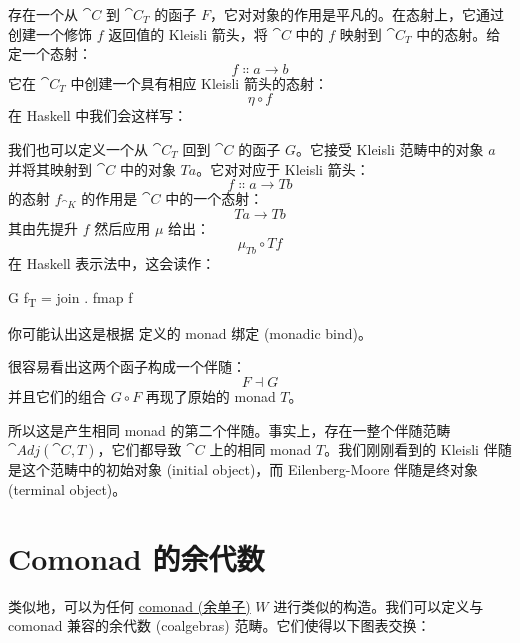 存在一个从 $\cat{C}$ 到 $\cat{C}_T$ 的函子 $F$，它对对象的作用是平凡的。在态射上，它通过创建一个修饰 $f$ 返回值的 Kleisli 箭头，将 $\cat{C}$ 中的 $f$ 映射到 $\cat{C}_T$ 中的态射。给定一个态射：
\[f \Colon a \to b\]
它在 $\cat{C}_T$ 中创建一个具有相应 Kleisli 箭头的态射：
\[\eta \circ f\]
在 Haskell 中我们会这样写：

我们也可以定义一个从 $\cat{C}_T$ 回到 $\cat{C}$ 的函子 $G$。它接受 Kleisli 范畴中的对象 $a$ 并将其映射到 $\cat{C}$ 中的对象 $T a$。它对对应于 Kleisli 箭头：
\[f \Colon a \to T b\]
的态射 $f_{\cat{K}}$ 的作用是 $\cat{C}$ 中的一个态射：
\[T a \to T b\]
其由先提升 $f$ 然后应用 $\mu$ 给出：
\[\mu_{T b} \circ T f\]
在 Haskell 表示法中，这会读作：

\begin{snipv}
G f\textsubscript{T} = join . fmap f
\end{snipv}
你可能认出这是根据  定义的 monad 绑定 (monadic bind)。

很容易看出这两个函子构成一个伴随：
\[F \dashv G\]
并且它们的组合 $G \circ F$ 再现了原始的 monad $T$。

所以这是产生相同 monad 的第二个伴随。事实上，存在一整个伴随范畴 $\cat{Adj}(\cat{C}, T)$，它们都导致 $\cat{C}$ 上的相同 monad $T$。我们刚刚看到的 Kleisli 伴随是这个范畴中的初始对象 (initial object)，而 Eilenberg-Moore 伴随是终对象 (terminal object)。

\section{Comonad 的余代数}

类似地，可以为任何 \hyperref[comonads]{comonad (余单子)} $W$ 进行类似的构造。我们可以定义与 comonad 兼容的余代数 (coalgebras) 范畴。它们使得以下图表交换：

\begin{figure}[H]
  \centering
  \begin{subfigure}
    \centering
  \end{subfigure}%
  \hspace{1cm}
  \begin{subfigure}
    \centering
  \end{subfigure}
\end{figure}

